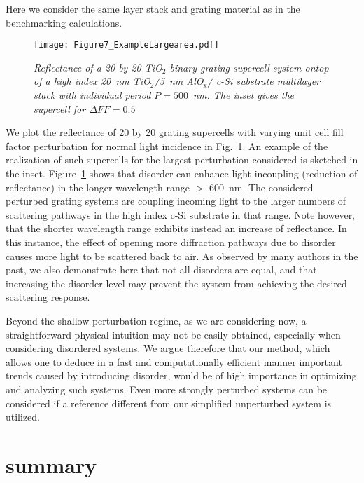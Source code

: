 \documentclass[ floatfix,reprint,amsmath,amssymb,aps,prb]{revtex4-1}
\begin{document}
Here we consider the same layer stack and grating material as in the benchmarking calculations. 
\begin{figure}[h]

	\texttt{[image: Figure7\_ExampleLargearea.pdf]}
	\caption{\textit{Reflectance of a  20 by 20 TiO$_2$ binary grating supercell system ontop of a high index 20~nm TiO$_2$/5~nm AlO$_\mathrm{x}$/ c-Si substrate multilayer stack with individual period  $P=500$~nm. The inset gives the supercell for $\Delta FF = 0.5$}} \label{fig7}

\end{figure}
We plot the reflectance of 20 by 20 grating supercells with varying unit cell fill factor perturbation for normal light incidence in Fig.~\ref{fig7}. An example of the realization of such supercells for the largest perturbation considered is sketched in the inset. Figure~\ref{fig7} shows that disorder can enhance light incoupling (reduction of reflectance) in the longer wavelength range $>$ 600~nm. The considered perturbed grating systems are coupling incoming light to the larger numbers of scattering pathways in the high index c-Si substrate in that range. Note however, that the shorter wavelength range exhibits instead an increase of reflectance. In this instance, the effect of opening more diffraction pathways due to disorder causes more light to be scattered back to air. As observed by many authors in the past\citep{Oskooi2012,Martins2013,Nanz2018,Piechulla2018}, we also demonstrate here that not all disorders are equal, and that increasing the disorder level may prevent the system from achieving the desired scattering response. 

Beyond the shallow perturbation regime, as we are considering now, a straightforward physical intuition may not be easily obtained, especially when considering disordered systems. We argue therefore that our method, which allows one to deduce in a fast and computationally efficient manner important trends caused by introducing disorder, would be of high importance in optimizing and analyzing such systems. Even more strongly perturbed systems can be considered if a reference different from our simplified unperturbed system is utilized. 

\section{summary}
\end{document}
